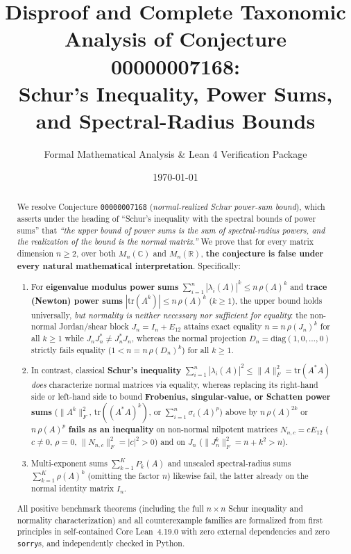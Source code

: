 \documentclass[11pt,a4paper]{article}
\title{\textbf{Disproof and Complete Taxonomic Analysis of Conjecture 00000007168:\\
Schur's Inequality, Power Sums, and Spectral-Radius Bounds}}
\author{Formal Mathematical Analysis \& Lean 4 Verification Package}
\date{\today}
\theoremstyle{plain}
\theoremstyle{definition}
\newcommand{\C}{\mathbb{C}}
\newcommand{\R}{\mathbb{R}}
\newcommand{\tr}{\mathrm{tr}}
\newcommand{\diag}{\mathrm{diag}}
\begin{document}
\maketitle

\begin{abstract}
We resolve Conjecture \texttt{00000007168} (\emph{normal-realized Schur power-sum bound}), which asserts under the heading of ``Schur's inequality with the spectral bounds of power sums'' that \emph{``the upper bound of power sums is the sum of spectral-radius powers, and the realization of the bound is the normal matrix.''} We prove that for every matrix dimension $n \ge 2$, over both $M_n(\C)$ and $M_n(\R)$, \textbf{the conjecture is false under every natural mathematical interpretation}. Specifically:
\begin{enumerate}
  \item For \textbf{eigenvalue modulus power sums} $\sum_{i=1}^n |\lambda_i(A)|^k \le n\,\rho(A)^k$ and \textbf{trace (Newton) power sums} $|\tr(A^k)| \le n\,\rho(A)^k$ ($k \ge 1$), the upper bound holds universally, \emph{but normality is neither necessary nor sufficient for equality}: the non-normal Jordan/shear block $J_n = I_n + E_{12}$ attains exact equality $n = n\,\rho(J_n)^k$ for all $k \ge 1$ while $J_n J_n^* \ne J_n^* J_n$, whereas the normal projection $D_n = \diag(1,0,\dots,0)$ strictly fails equality ($1 < n = n\,\rho(D_n)^k$) for all $k \ge 1$.
  \item In contrast, classical \textbf{Schur's inequality} $\sum_{i=1}^n |\lambda_i(A)|^2 \le \|A\|_F^2 = \tr(A^* A)$ \emph{does} characterize normal matrices via equality, whereas replacing its right-hand side or left-hand side to bound \textbf{Frobenius, singular-value, or Schatten power sums} ($\|A^k\|_F^2$, $\tr((A^* A)^k)$, or $\sum_{i=1}^n \sigma_i(A)^p$) above by $n\,\rho(A)^{2k}$ or $n\,\rho(A)^p$ \textbf{fails as an inequality} on non-normal nilpotent matrices $N_{n,c} = c E_{12}$ ($c \ne 0$, $\rho = 0$, $\|N_{n,c}\|_F^2 = |c|^2 > 0$) and on $J_n$ ($\|J_n^k\|_F^2 = n + k^2 > n$).
  \item Multi-exponent sums $\sum_{k=1}^K P_k(A)$ and unscaled spectral-radius sums $\sum_{k=1}^K \rho(A)^k$ (omitting the factor $n$) likewise fail, the latter already on the normal identity matrix $I_n$.
\end{enumerate}
All positive benchmark theorems (including the full $n \times n$ Schur inequality and normality characterization) and all counterexample families are formalized from first principles in self-contained Core Lean~4.19.0 with zero external dependencies and zero \texttt{sorry}s, and independently checked in Python.
\end{abstract}
\end{document}
